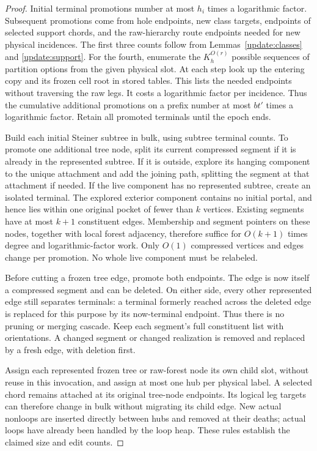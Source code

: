 \begin{proof}
Initial terminal promotions number at most $h_i$ times a logarithmic
factor.  Subsequent promotions come from hole endpoints, new class
targets, endpoints of selected support chords, and the raw-hierarchy
route endpoints needed for new physical incidences.  The first three
counts follow from Lemmas~\ref{update:classes} and
\ref{update:support}.  For the fourth, enumerate the
$K_h^{O(r)}$ possible sequences of partition options from the given
physical slot.  At each step look up the entering copy and its frozen
cell root in stored tables.  This lists the needed endpoints without
traversing the raw legs.  It costs a logarithmic factor per incidence.
Thus the cumulative additional promotions on a prefix number at most
$bt'$ times a logarithmic factor.  Retain all promoted terminals until
the epoch ends.

Build each initial Steiner subtree in bulk, using subtree terminal
counts.  To promote one additional tree node, split its current
compressed segment if it is already in the represented subtree.  If
it is outside, explore its hanging component to the unique attachment
and add the joining path, splitting the segment at that attachment if
needed.  If the live component has no represented subtree, create an
isolated terminal.  The explored exterior component contains no
initial portal, and hence lies within one original pocket of fewer
than $k$ vertices.  Existing segments have at most $k+1$ constituent
edges.  Membership and segment pointers on these nodes, together with
local forest adjacency, therefore suffice for
$O(k+1)$ times degree and logarithmic-factor work.  Only $O(1)$
compressed vertices and edges change per promotion.  No whole live
component must be relabeled.

Before cutting a frozen tree edge, promote both endpoints.  The edge
is now itself a compressed segment and can be deleted.  On either
side, every other represented edge still separates terminals: a
terminal formerly reached across the deleted edge is replaced for
this purpose by its now-terminal endpoint.  Thus there is no pruning
or merging cascade.  Keep each segment's full constituent list with
orientations.  A changed segment or changed realization is removed
and replaced by a fresh edge, with deletion first.

Assign each represented frozen tree or raw-forest node its own child
slot, without reuse in this invocation, and assign at most one hub
per physical label.  A selected chord remains attached at its
original tree-node endpoints.  Its logical leg targets can therefore
change in bulk without migrating its child edge.  New actual
nonloops are inserted directly between hubs and removed at their
deaths; actual loops have already been handled by the loop heap.
These rules establish the claimed size and edit counts.


\end{proof}
